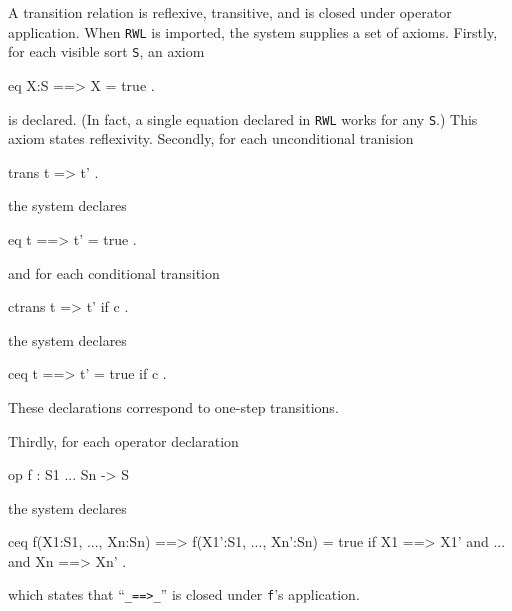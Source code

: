 \documentclass[a4paper]{memoir}
\begin{document}
A transition relation is reflexive, transitive, and is closed under
operator application. When \verb|RWL| is imported, the system
supplies a set of axioms.
Firstly, for each visible sort \verb|S|, an axiom
\begin{vvtm}
\begin{ccode}
  eq X:S ==> X = true .
\end{ccode}
\end{vvtm}
is declared. (In fact, a single equation declared in \verb|RWL| works
for any \verb|S|.) This axiom states reflexivity.
Secondly, for each unconditional tranision
\begin{vvtm}
\begin{ccode}
  trans t => t' .
\end{ccode}
\end{vvtm}
the system declares
\begin{vvtm}
\begin{ccode}
  eq t ==> t' = true .
\end{ccode}
\end{vvtm}
and for each conditional transition
\begin{vvtm}
\begin{ccode}
  ctrans t => t' if c .
\end{ccode}
\end{vvtm}
the system declares
\begin{vvtm}
\begin{ccode}
  ceq t ==> t' = true if c .
\end{ccode}
\end{vvtm}
These declarations correspond to one-step transitions.

Thirdly, for each operator declaration
\begin{vvtm}
\begin{ccode}
  op f : S1 ... Sn -> S
\end{ccode}
\end{vvtm}
the system declares
\begin{vvtm}
\begin{ccode}
  ceq f(X1:S1, ..., Xn:Sn) ==> f(X1':S1, ..., Xn':Sn) = true
     if X1 ==> X1' and ... and Xn ==> Xn' .
\end{ccode}
\end{vvtm}
which states that ``\verb|_==>_|'' is closed under \verb|f|'s
application.
\end{document}
